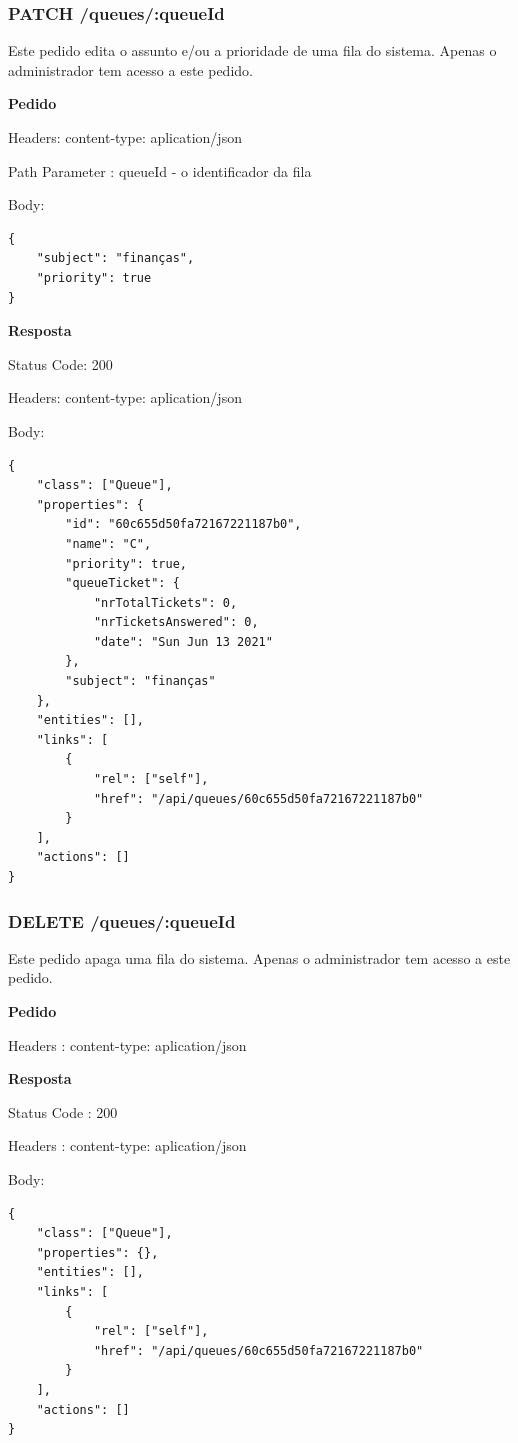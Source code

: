 \documentclass[12pt,a4paper]{article}
\begin{document}
\subsubsection{PATCH /queues/:queueId}
Este pedido edita o assunto e/ou a prioridade de uma fila do sistema. Apenas o administrador tem acesso a este pedido.\par
\vspace{0.5 cm}
\textbf{Pedido}\par
Headers: content-type: aplication/json\par
Path Parameter : queueId - o identificador da fila\par
Body:
\begin{verbatim}
{
    "subject": "finanças",
    "priority": true
}
\end{verbatim}



\textbf{Resposta}\par
Status Code: 200\par
Headers: content-type: aplication/json\par
Body:
\begin{verbatim}
{     
    "class": ["Queue"],
    "properties": {
        "id": "60c655d50fa72167221187b0",         
        "name": "C",
        "priority": true,
        "queueTicket": {
            "nrTotalTickets": 0,
            "nrTicketsAnswered": 0,
            "date": "Sun Jun 13 2021"         
        },
        "subject": "finanças"    
    },
    "entities": [],
    "links": [         
        {             
            "rel": ["self"],
            "href": "/api/queues/60c655d50fa72167221187b0"
        }     
    ],
    "actions": []
}
\end{verbatim}
 \pagebreak
\subsubsection{DELETE /queues/:queueId}
Este pedido apaga uma fila do sistema. Apenas o administrador tem acesso a este pedido.\par
\vspace{0.5 cm}
\textbf{Pedido}\par
Headers : content-type: aplication/json \par
\vspace{0.5 cm}
\textbf{Resposta}\par
Status Code : 200 \par
Headers : content-type: aplication/json \par
Body: 
\begin{verbatim}
{
    "class": ["Queue"],
    "properties": {},
    "entities": [],
    "links": [         
        {
            "rel": ["self"],
            "href": "/api/queues/60c655d50fa72167221187b0"
        }    
    ],
    "actions": []
}
\end{verbatim}
\pagebreak
\end{document}
